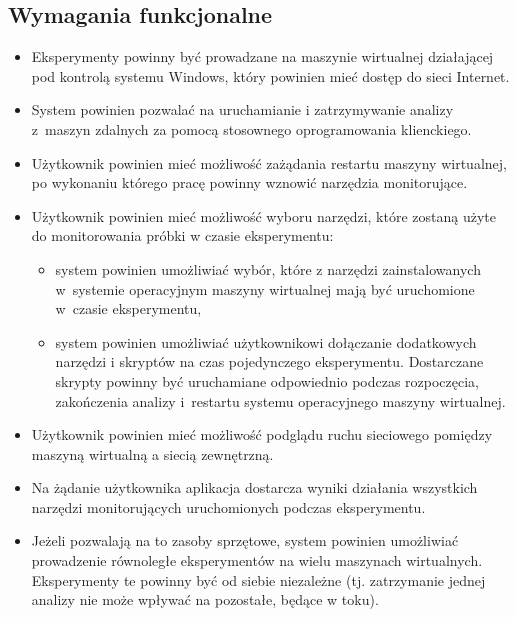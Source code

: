 \documentclass[a4paper,12pt,oneside]{article}
\begin{document}
	\subsection{Wymagania funkcjonalne}
	\begin{itemize}
		\item Eksperymenty powinny być prowadzane na maszynie wirtualnej działającej pod kontrolą systemu Windows, który powinien mieć dostęp do sieci Internet.
		\item System powinien pozwalać na uruchamianie i zatrzymywanie analizy z~maszyn zdalnych za pomocą stosownego oprogramowania klienckiego.
		\item Użytkownik powinien mieć możliwość zażądania restartu maszyny wirtualnej, po wykonaniu którego pracę powinny wznowić narzędzia monitorujące.
		\item Użytkownik powinien mieć możliwość wyboru narzędzi, które zostaną użyte do monitorowania próbki w czasie eksperymentu:
		\begin{itemize}
			\item system powinien umożliwiać wybór, które z narzędzi zainstalowanych w~systemie operacyjnym maszyny wirtualnej mają być uruchomione w~czasie eksperymentu,
			\item system powinien umożliwiać użytkownikowi dołączanie dodatkowych narzędzi i skryptów na czas pojedynczego eksperymentu. Dostarczane skrypty powinny być uruchamiane odpowiednio podczas rozpoczęcia, zakończenia analizy i~restartu systemu operacyjnego maszyny wirtualnej.
		\end{itemize}
		\item Użytkownik powinien mieć możliwość podglądu ruchu sieciowego pomiędzy maszyną wirtualną a siecią zewnętrzną.	
		\item Na żądanie użytkownika aplikacja dostarcza wyniki działania wszystkich narzędzi monitorujących uruchomionych podczas eksperymentu.
		\item Jeżeli pozwalają na to zasoby sprzętowe, system powinien umożliwiać prowadzenie równoległe eksperymentów na wielu maszynach wirtualnych. Eksperymenty te powinny być od siebie niezależne (tj. zatrzymanie jednej analizy nie może wpływać na pozostałe, będące w toku).
	\end{itemize}
	
\end{document}
